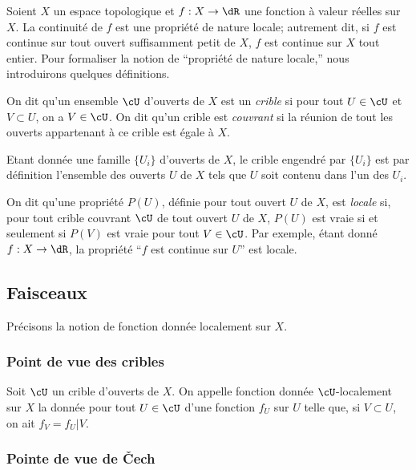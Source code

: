 Soient $X$ un espace topologique et $f:X\to \dR$ une fonction à valeur 
réelles sur $X$. La continuité de $f$ est une propriété de nature 
locale; autrement dit, si $f$ est continue sur tout ouvert suffisamment petit 
de $X$, $f$ est continue sur $X$ tout entier. Pour formaliser la notion de 
``propriété de nature locale,'' nous introduirons quelques définitions.

On dit qu'un ensemble $\cU$ d'ouverts de $X$ est un \emph{crible} si pour tout 
$U\in\cU$ et $V\subset U$, on a $V\in\cU$. On dit qu'un crible est 
\emph{couvrant} si la réunion de tout les ouverts appartenant à ce crible est 
égale à $X$.

Etant donnée une famille $\{U_i\}$ d'ouverts de $X$, le crible engendré par 
$\{U_i\}$ est par définition l'ensemble des ouverts $U$ de $X$ tels que $U$ 
soit contenu dans l'un des $U_i$. 

On dit qu'une propriété $P(U)$, définie pour tout ouvert $U$ de $X$, est 
\emph{locale} si, pour tout crible couvrant $\cU$ de tout ouvert $U$ de $X$, 
$P(U)$ est vraie si et seulement si $P(V)$ est vraie pour tout $V\in \cU$. Par 
exemple, étant donné $f:X\to \dR$, la propriété ``$f$ est continue sur $U$'' 
est locale. 





\subsection{Faisceaux}\label{I:1-2}

Précisons la notion de fonction donnée localement sur $X$.





\subsubsection{Point de vue des cribles}\label{I:1-2-1}

Soit $\cU$ un crible d'ouverts de $X$. On appelle fonction donnée 
$\cU$-localement sur $X$ la donnée pour tout $U\in \cU$ d'une fonction $f_U$ 
sur $U$ telle que, si $V\subset U$, on ait $f_V=f_U|V$. 





\subsubsection{Pointe de vue de Čech}\label{I:1-2-2}

